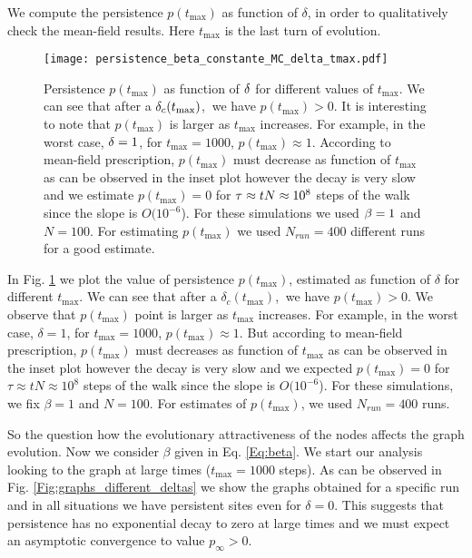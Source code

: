 \documentclass[3p, 11pt]{elsarticle}
\begin{document}
We compute the persistence $p(t_{\max })$ as function of $\delta $, in order
to qualitatively check the mean-field results. Here $t_{\max }$ is the last
turn of evolution.

\begin{figure}[th]
\begin{center}
\texttt{[image: persistence\_beta\_constante\_MC\_delta\_tmax.pdf]}
\end{center}
\caption{Persistence $p(t_{\max })$ as function of $\protect\delta $ for
different values of $t_{\max }$. We can see that after a $\protect\delta %
_{c}(t_{\max })$, $\ $we have $p(t_{\max })>0$. It is interesting to note
that $p(t_{\max })$ is larger as $t_{\max }$ increases. For example, in the
worst case, $\protect\delta =1$, for $t_{\max }=1000$, $p(t_{\max })\approx
1 $. According to mean-field prescription, $p(t_{\max })$ must decrease as
function of $t_{\max }$ as can be observed in the inset plot however the
decay is very slow and we estimate $p(t_{\max })=0$ for $\protect\tau %
\approx tN\approx 10^{8}$ steps of the walk since the slope is $O(10^{-6}$).
For these simulations we used $\protect\beta =1$ and $N=100$. For estimating 
$p(t_{\max })$ we used $N_{run}=400$ different runs for a good estimate. }
\label{Fig:Corroborating_exponencial_decay_MC}
\end{figure}

In Fig. \ref{Fig:Corroborating_exponencial_decay_MC} we plot the value of
persistence $p(t_{\max })$, estimated as function of $\delta $ for different 
$t_{\max }$. We can see that after a $\delta _{c}(t_{\max })$, $\ $we have $%
p(t_{\max })>0$. We observe that $p(t_{\max })$ point is larger as $t_{\max
} $ increases. For example, in the worst case, $\delta =1$, for $t_{\max
}=1000 $, $p(t_{\max })\approx 1$. But according to mean-field prescription, 
$p(t_{\max })$ must decreases as function of $t_{\max }$ as can be observed
in the inset plot however the decay is very slow and we expected $p(t_{\max
})=0$ for $\tau \approx tN\approx 10^{8}$ steps of the walk since the slope
is $O(10^{-6}$). For these simulations, we fix $\beta =1$ and $N=100$. For
estimates of $p(t_{\max })$, we used $N_{run}=400$ runs.

So the question how the evolutionary attractiveness of the nodes affects the
graph evolution. Now we consider $\beta $ given in Eq. \ref{Eq:beta}. We
start our analysis looking to the graph at large times ($t_{\max }=1000$
steps). As can be observed in Fig. \ref{Fig:graphs_different_deltas} we show
the graphs obtained for a specific run and in all situations we have
persistent sites even for $\delta =0$. This suggests that persistence has no
exponential decay to zero at large times and we must expect an asymptotic
convergence to value $p_{\infty }>0$.
\end{document}
